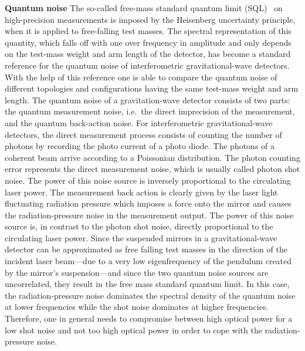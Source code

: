 \textbf{Quantum noise} The so-called free-mass standard quantum limit
(SQL)~\cite{Braginsky1968,Braginsky1999} on high-precision
measurements is imposed by the Heisenberg uncertainty principle,
when it is applied to free-falling test masses. The spectral
representation of this quantity, which falls off with one over
frequency in amplitude and only depends on the test-mass weight
and arm length of the detector, has become a standard reference
for the quantum noise of interferometric gravitational-wave
detectors. With the help of this reference one is able to compare
the quantum noise of different topologies and configurations
having the same test-mass weight and arm length. The quantum noise
of a gravitation-wave detector consists of two parts: the quantum
measurement noise, i.e.\ the direct imprecision of the measurement,
and the quantum back-action noise. For interferometric
gravitational-wave detectors, the direct measurement process
consists of counting the number of photons by recording the photo
current of a photo diode. The photons of a coherent beam arrive
according to a Poissonian distribution. The photon counting error
represents the direct measurement noise, which is usually called
photon shot noise. The power of this noise source is inversely
proportional to the circulating laser power. The measurement
back action is clearly given by the laser light fluctuating
radiation pressure which imposes a force onto the mirror and
causes the radiation-pressure noise in the measurement output. The
power of this noise source is, in contrast to the photon shot noise,
directly proportional to the circulating laser power. Since the
suspended mirrors in a gravitational-wave detector can be
approximated as free falling test masses in the direction of the
incident laser beam---due to a very low eigenfrequency of the
pendulum created by the mirror's suspension---and since the two quantum
noise sources are uncorrelated, they result in the free mass
standard quantum limit. In this case, the radiation-pressure noise
dominates the spectral density of the quantum noise at lower
frequencies while the shot noise dominates at higher frequencies.
Therefore, one in general needs to compromise between high optical
power for a low shot noise and not too high optical power in order
to cope with the radiation-pressure noise.

